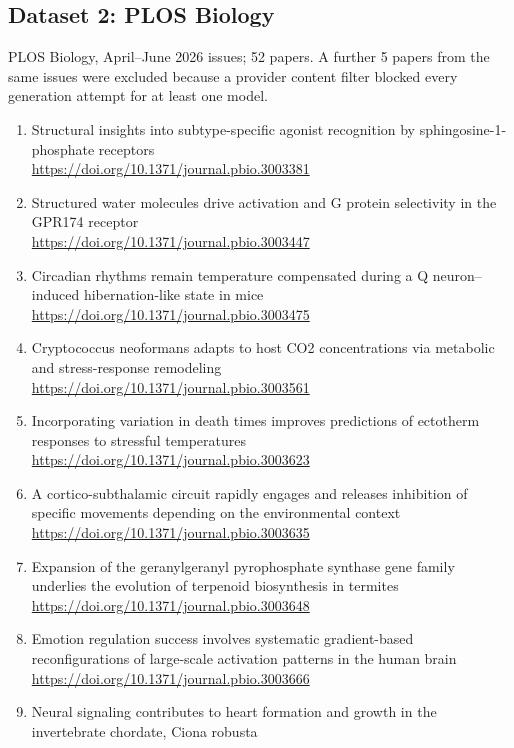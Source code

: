 \subsection{Dataset 2: PLOS Biology}
\label{app:dataset-plos}
PLOS Biology, April--June 2026 issues; 52 papers. A further 5 papers from the same issues were excluded because a provider content filter blocked every generation attempt for at least one model.
\begin{enumerate}
  \item Structural insights into subtype-specific agonist recognition by sphingosine-1-phosphate receptors\\
        \url{https://doi.org/10.1371/journal.pbio.3003381}
  \item Structured water molecules drive activation and G protein selectivity in the GPR174 receptor\\
        \url{https://doi.org/10.1371/journal.pbio.3003447}
  \item Circadian rhythms remain temperature compensated during a Q neuron--induced hibernation-like state in mice\\
        \url{https://doi.org/10.1371/journal.pbio.3003475}
  \item Cryptococcus neoformans adapts to host CO2 concentrations via metabolic and stress-response remodeling\\
        \url{https://doi.org/10.1371/journal.pbio.3003561}
  \item Incorporating variation in death times improves predictions of ectotherm responses to stressful temperatures\\
        \url{https://doi.org/10.1371/journal.pbio.3003623}
  \item A cortico-subthalamic circuit rapidly engages and releases inhibition of specific movements depending on the environmental context\\
        \url{https://doi.org/10.1371/journal.pbio.3003635}
  \item Expansion of the geranylgeranyl pyrophosphate synthase gene family underlies the evolution of terpenoid biosynthesis in termites\\
        \url{https://doi.org/10.1371/journal.pbio.3003648}
  \item Emotion regulation success involves systematic gradient-based reconfigurations of large-scale activation patterns in the human brain\\
        \url{https://doi.org/10.1371/journal.pbio.3003666}
  \item Neural signaling contributes to heart formation and growth in the invertebrate chordate, Ciona robusta\\

\end{enumerate}
